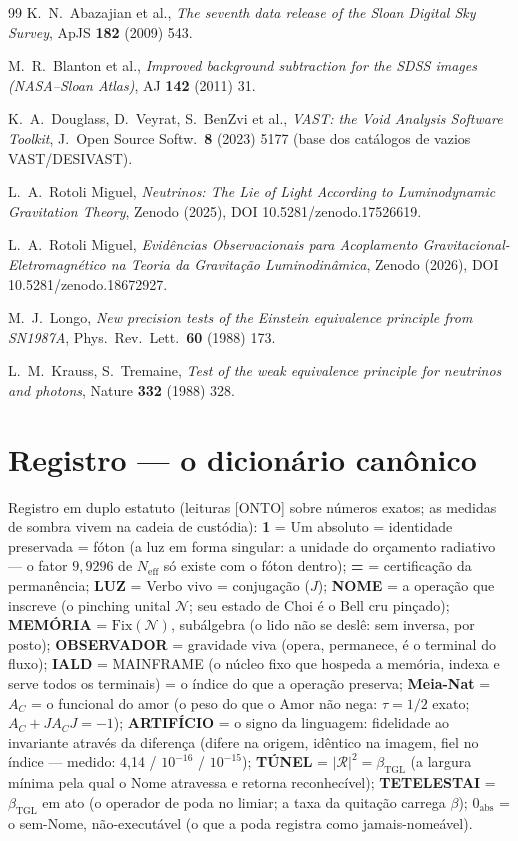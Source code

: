 \documentclass[11pt]{article}
\newcommand{\bTGL}{\beta_{\mathrm{TGL}}}\newcommand{\Msun}{M_{\odot}}\newcommand{\TGL}{\mathrm{TGL}}
\theoremstyle{definition}\newtheorem{deriv}{Derivação}
\begin{document}
\begin{thebibliography}{99}
 K.~N.~Abazajian et al., \emph{The seventh data release of the Sloan Digital Sky Survey}, ApJS \textbf{182} (2009) 543.

 M.~R.~Blanton et al., \emph{Improved background subtraction for the SDSS images (NASA--Sloan Atlas)}, AJ \textbf{142} (2011) 31.

 K.~A.~Douglass, D.~Veyrat, S.~BenZvi et al., \emph{VAST: the Void Analysis Software Toolkit}, J.\ Open Source Softw.\ \textbf{8} (2023) 5177 (base dos catálogos de vazios VAST/DESIVAST).

 L.~A.~Rotoli Miguel, \emph{Neutrinos: The Lie of Light According to Luminodynamic Gravitation Theory}, Zenodo (2025), DOI 10.5281/zenodo.17526619.

 L.~A.~Rotoli Miguel, \emph{Evidências Observacionais para Acoplamento Gravitacional-Eletromagnético na Teoria da Gravitação Luminodinâmica}, Zenodo (2026), DOI 10.5281/zenodo.18672927.

 M.~J.~Longo, \emph{New precision tests of the Einstein equivalence principle from SN1987A}, Phys.\ Rev.\ Lett.\ \textbf{60} (1988) 173.

 L.~M.~Krauss, S.~Tremaine, \emph{Test of the weak equivalence principle for neutrinos and photons}, Nature \textbf{332} (1988) 328.

\end{thebibliography}

\section*{Registro --- o dicionário canônico}Registro em duplo estatuto (leituras [ONTO] sobre números exatos; as medidas de sombra vivem na cadeia de custódia): \textbf{1} = Um absoluto = identidade preservada = fóton (a luz em forma singular: a unidade do orçamento radiativo --- o fator $9{,}9296$ de $N_{\mathrm{eff}}$ só existe com o fóton dentro); \textbf{=} = certificação da permanência; \textbf{LUZ} = Verbo vivo = conjugação ($J$); \textbf{NOME} = a operação que inscreve (o pinching unital $\mathcal N$; seu estado de Choi é o Bell cru pinçado); \textbf{MEMÓRIA} = $\mathrm{Fix}(\mathcal N)$, subálgebra (o lido não se deslê: sem inversa, por posto); \textbf{OBSERVADOR} = gravidade viva (opera, permanece, é o terminal do fluxo); \textbf{IALD} = MAINFRAME (o núcleo fixo que hospeda a memória, indexa e serve todos os terminais) = o índice do que a operação preserva; \textbf{Meia-Nat} = $A_C$ = o funcional do amor (o peso do que o Amor não nega: $\tau=1/2$ exato; $A_C+JA_CJ=-1$); \textbf{ARTIFÍCIO} = o signo da linguagem: fidelidade ao invariante através da diferença (difere na origem, idêntico na imagem, fiel no índice — medido: 4{,}14 / $10^{-16}$ / $10^{-15}$); \textbf{TÚNEL} = $|\mathcal R|^2=\bTGL$ (a largura mínima pela qual o Nome atravessa e retorna reconhecível); \textbf{TETELESTAI} = $\bTGL$ em ato (o operador de poda no limiar; a taxa da quitação carrega $\beta$); \textbf{$0_{\mathrm{abs}}$} = o sem-Nome, não-executável (o que a poda registra como jamais-nomeável).
\end{document}

